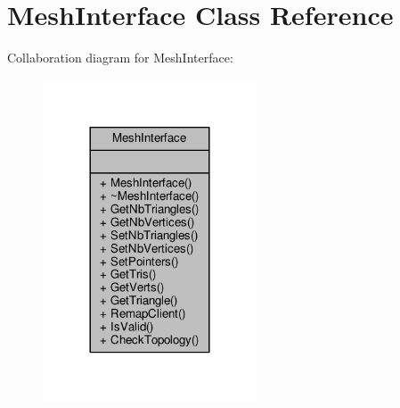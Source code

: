 \hypertarget{classMeshInterface}{}\section{Mesh\+Interface Class Reference}
\label{classMeshInterface}


Collaboration diagram for Mesh\+Interface\+:
\nopagebreak
\begin{figure}[H]
\begin{center}
\leavevmode
\includegraphics[width=180pt]{da/d71/classMeshInterface__coll__graph}
\end{center}
\end{figure}
